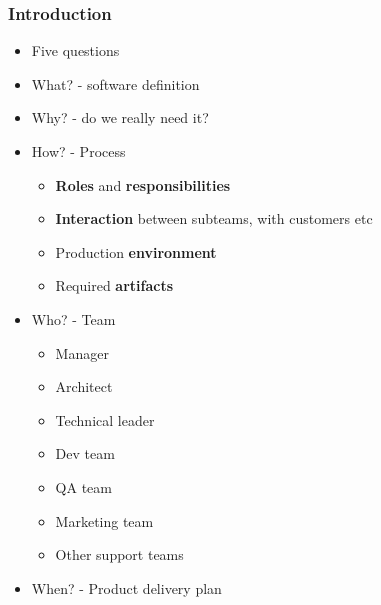 \begin{frame}
\frametitle{Introduction}
\begin{itemize}
    \item<1-> Five questions
    \item<2-> What? - software definition
    \item<3-> Why? - do we really need it?
    \item<4-> How? - Process
        \begin{itemize}
            \item<2-> \textbf{Roles} and \textbf{responsibilities}
            \item<3-> \textbf{Interaction} between subteams, with customers etc
            \item<4-> Production \textbf{environment}
            \item<5-> Required \textbf{artifacts}
        \end{itemize}
    \item<5-> Who? - Team
        \begin{itemize}
            \item<6-> Manager
            \item<7-> Architect
            \item<8-> Technical leader
            \item<9-> Dev team
            \item<10-> QA team
            \item<11-> Marketing team
            \item<12-> Other support teams
        \end{itemize}
    \item<13-> When? - Product delivery plan
\end{itemize}
\end{frame}
